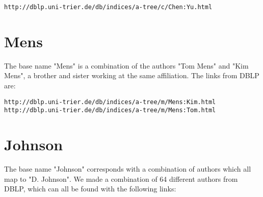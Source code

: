 \begin{verbatim}
http://dblp.uni-trier.de/db/indices/a-tree/c/Chen:Yu.html
\end{verbatim}

\section*{Mens}

The base name "Mens" is a combination of the authors "Tom Mens" and "Kim Mens", a brother and sister working at the same affiliation. The links from DBLP are:

\begin{verbatim}
http://dblp.uni-trier.de/db/indices/a-tree/m/Mens:Kim.html
http://dblp.uni-trier.de/db/indices/a-tree/m/Mens:Tom.html
\end{verbatim}

\section*{Johnson}

The base name "Johnson" corresponds with a combination of authors which all map to "D. Johnson". We made a combination of 64 different authors from DBLP, which can all be found with the following links:


